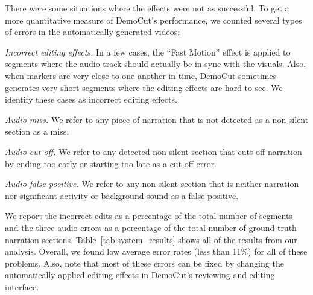 There were some situations where the effects were not as successful.
%
To get a more quantitative measure of DemoCut's performance, we
counted several types of errors in the automatically generated
videos:

{\em Incorrect editing effects.} In a few cases, the ``Fast Motion''
effect is applied to segments where the audio track should actually be
in sync with the visuals. Also, when markers are very close to one
another in time, DemoCut sometimes generates very short segments where the editing effects are hard to see.
%
We identify these cases as incorrect editing effects.

{\em Audio miss.} We refer to any piece of narration that is not
detected as a non-silent section as a miss.

{\em Audio cut-off.} We refer to any detected non-silent section that
cuts off narration by ending too early or starting too late as a
cut-off error.

{\em Audio false-positive.} We refer to any non-silent section that is
neither narration nor significant activity or background sound as a false-positive.

We report the incorrect edits as a percentage of the total number of
segments and the three audio errors as a percentage of the total
number of ground-truth narration sections.
%
Table~\ref{tab:system_results} shows all of the results from our
analysis.
%
Overall, we found low average error rates (less than 11\%) for all of
these problems.
%
Also, note that most of these errors can be fixed by changing the
automatically applied editing effects in DemoCut's reviewing and
editing interface.

